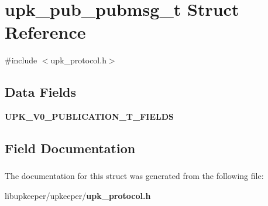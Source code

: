 \section{upk\_\-pub\_\-pubmsg\_\-t Struct Reference}
\label{structupk__pub__pubmsg__t}


{\ttfamily \#include $<$upk\_\-protocol.h$>$}

\subsection*{Data Fields}
\begin{DoxyCompactItemize}
\item 
{\bf UPK\_\-V0\_\-PUBLICATION\_\-T\_\-FIELDS}
\end{DoxyCompactItemize}


\subsection{Field Documentation}
\subsubsection[{UPK\_\-V0\_\-PUBLICATION\_\-T\_\-FIELDS}]{}\label{structupk__pub__pubmsg__t_a9adbc08b3864823e0dfb29430eeb2efd}


The documentation for this struct was generated from the following file:\begin{DoxyCompactItemize}
\item 
libupkeeper/upkeeper/{\bf upk\_\-protocol.h}\end{DoxyCompactItemize}
